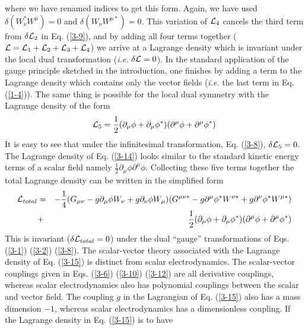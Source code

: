 \documentclass[a4paper,aps]{revtex4}
\begin{document}
where we have renamed indices to get this form. Again, we
have used $\delta (W_{\nu}^{\ast} W^{\mu}) = 0$ and
$\delta (W_{\nu} W^{\mu \ast}) = 0$. This variation
of ${\cal L}_4$ cancels the third term from $\delta {\cal L} _2$
in Eq. (\ref{3-9}), and by adding all four terms together
(${\cal L} = {\cal L}_1 +{\cal L}_2+{\cal L}_3+{\cal L}_4$) we
arrive at a Lagrange density which is invariant under the local
dual transformation ({\it i.e.} $\delta {\cal L} = 0$). In the
standard application of the gauge principle sketched in the
introduction, one finishes by adding a term to the
Lagrange density which contains only the vector fields
({\it i.e.} the last term in Eq. (\ref{1-4})).
The same thing is possible for the local dual symmetry
with the Lagrange density of the form
\begin{equation}
\label{3-14}
{\cal L}_5 =\frac{1}{2}(\partial _{\mu} \phi + \partial _{\mu} \phi ^{\ast})
(\partial ^{\mu} \phi + \partial ^{\mu} \phi ^{\ast})
\end{equation}
It is easy to see that under the infinitesimal transformation,
Eq. (\ref{3-8}), $\delta {\cal L}_5 =0$. The Lagrange density
of Eq. (\ref{3-14}) looks similar to the standard
kinetic energy terms of a scalar field namely
$\frac{1}{2} \partial _{\mu} \phi \partial ^{\mu} \phi$. Collecting
these five terms together the total Lagrange density can be written
in the simplified form
\begin{eqnarray}
\label{3-15}
{\cal L}_{total} &=& -\frac{1}{4}(G_{\mu \nu} - g \partial _{\mu} \phi
W_{\nu}+ g \partial _{\nu} \phi W_{\mu})
(G^{\mu \nu \ast} - g \partial ^{\mu} \phi ^{\ast} W^{\nu \ast}
+ g \partial ^{\nu} \phi ^{\ast} W^{\mu \ast}) \\
&+&\frac{1}{2}(\partial _{\mu} \phi + \partial _{\mu} \phi ^{\ast})
(\partial ^{\mu} \phi + \partial ^{\mu} \phi ^{\ast})  \nonumber
\end{eqnarray}
This is invariant ($\delta {\cal L}_{total} = 0$) under the dual
``gauge'' transformations of Eqs. (\ref{3-1}) (\ref{3-2}) (\ref{3-8}).
The scalar-vector theory associated with the Lagrange density of
Eq. (\ref{3-15}) is distinct from scalar electrodynamics. The scalar-vector
couplings given in Eqs. (\ref{3-6}) (\ref{3-10}) (\ref{3-12})
are all derivative couplings, whereas scalar electrodynamics also has
polynomial couplings between the scalar and vector field. The
coupling $g$ in the Lagrangian of Eq. (\ref{3-15}) also has
a mass dimension $-1$, whereas
scalar electrodynamics has a dimensionless
coupling. If the Lagrange density in Eq. (\ref{3-15}) is to have
\end{document}
